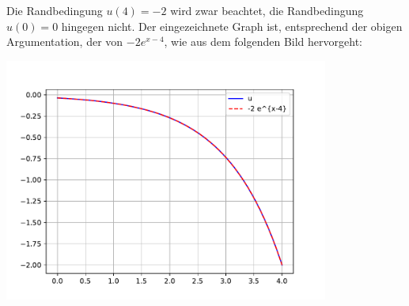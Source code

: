 Die Randbedingung $u(4) = -2$ wird zwar beachtet, die Randbedingung $u(0) = 0$ hingegen nicht.
Der eingezeichnete Graph ist, entsprechend der obigen Argumentation, der von $-2 e^{x-4}$, wie aus dem folgenden Bild hervorgeht:

\begin{center}
  \includegraphics[width = 0.8\textwidth]{chapter_04/exercise_04_22_figure_2.pdf}
\end{center}






